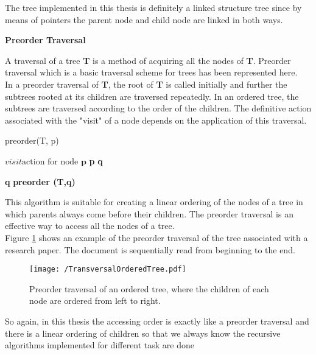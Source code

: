 		The tree implemented in this thesis is definitely a linked structure tree since by means of pointers the parent node and child node are linked in both ways.
		
		
		\textbf{Preorder Traversal}
		
		A traversal of a tree \textbf{T} is a method of acquiring all the nodes of \textbf{T}. Preorder traversal which is a basic traversal scheme for trees has been represented here.\\
		In a preorder traversal of \textbf{T}, the root of \textbf{T} is called initially and further the subtrees rooted at its children are traversed repeatedly. In an ordered tree, the subtrees are traversed according to the order of the children. The definitive action associated with the "visit" of a node depends on the application of this traversal.\\
		
		\begin{algorithm}
		\caption{preorder(T, p)}\label{alg:peroder1}
		\begin{algorithmic}[1]
		\State {} $\textit{visit} \text{action for node }\textbf{p}$
		 \textbf{p}   \textbf{q}
		
		\State {} \textbf{q } \textbf{preorder (T,q)}
		\EndFor
		\EndProcedure
		\end{algorithmic}
		\end{algorithm}
		
		This algorithm is suitable for creating a linear ordering of the nodes of a tree in which parents always come before their children. The preorder traversal is an effective way to access all the nodes of a tree.\\
		
		
		Figure \ref{fig:TransversalOrderedTree} shows an example of the preorder traversal of the tree associated with a research paper. The document is sequentially read from beginning to the end.
		
				\begin{figure}[h]
				\centering
					\texttt{[image: /TransversalOrderedTree.pdf]}
					\caption{Preorder traversal of an ordered tree, where the children of each node are ordered from left to right.}
					\label{fig:TransversalOrderedTree}
				\end{figure}
				
So again, in this thesis the accessing order is exactly like a preorder traversal and there is a linear ordering of children so that we always know the recursive algorithms implemented for different task are done		
		
